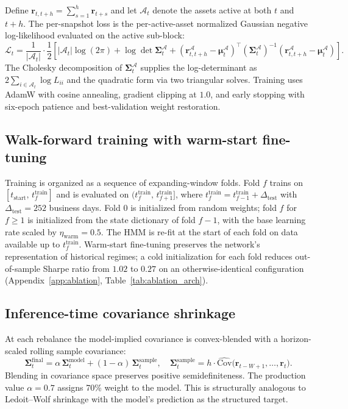 \documentclass[11pt]{article}
\newcommand{\Cov}{\mathrm{Cov}}
\newcommand{\Sig}{\boldsymbol{\Sigma}}
\newcommand{\bmu}{\boldsymbol{\mu}}
\newcommand{\br}{\mathbf{r}}
\begin{document}
Define $\br_{t,t+h} = \sum_{s=1}^{h}\br_{t+s}$ and let $\mathcal{A}_t$
denote the assets active at both $t$ and $t{+}h$. The per-snapshot
loss is the per-active-asset normalized Gaussian negative
log-likelihood evaluated on the active sub-block:
\begin{equation}
\mathcal{L}_t = \frac{1}{|\mathcal{A}_t|}\cdot
\frac{1}{2}\!\left[
|\mathcal{A}_t|\log(2\pi)
+ \log\det \Sig_t^{\mathcal{A}}
+ (\br_{t,t+h}^{\mathcal{A}} - \bmu_t^{\mathcal{A}})^\top
  (\Sig_t^{\mathcal{A}})^{-1}
  (\br_{t,t+h}^{\mathcal{A}} - \bmu_t^{\mathcal{A}})
\right].
\label{eq:nll}
\end{equation}
The Cholesky decomposition of $\Sig_t^{\mathcal{A}}$ supplies the
log-determinant as $2\sum_{i\in\mathcal{A}_t}\log L_{ii}$ and the
quadratic form via two triangular solves. Training uses AdamW with
cosine annealing, gradient clipping at $1.0$, and early stopping with
six-epoch patience and best-validation weight restoration.

\subsection{Walk-forward training with warm-start fine-tuning}\label{sec:walkforward}

Training is organized as a sequence of expanding-window folds. Fold $f$
trains on $[t_{\text{start}},\, t_f^{\text{train}}]$ and is evaluated
on $(t_f^{\text{train}},\, t_{f+1}^{\text{train}}]$, where
$t_f^{\text{train}} = t_{f-1}^{\text{train}} + \Delta_{\text{test}}$
with $\Delta_{\text{test}} = 252$ business days. Fold $0$ is initialized
from random weights; fold $f$ for $f\geq 1$ is initialized from the
state dictionary of fold $f{-}1$, with the base learning rate scaled by
$\eta_{\text{warm}} = 0.5$. The HMM is re-fit at the start of each fold
on data available up to $t_f^{\text{train}}$. Warm-start fine-tuning
preserves the network's representation of historical regimes; a cold
initialization for each fold reduces out-of-sample Sharpe ratio from
$1.02$ to $0.27$ on an otherwise-identical configuration
(Appendix~\ref{app:ablation}, Table~\ref{tab:ablation_arch}).

\subsection{Inference-time covariance shrinkage}\label{sec:shrinkage}

At each rebalance the model-implied covariance is convex-blended with a
horizon-scaled rolling sample covariance:
\begin{equation}
\Sig_t^{\text{final}} = \alpha\,\Sig_t^{\text{model}} + (1-\alpha)\,\Sig_t^{\text{sample}},
\quad
\Sig_t^{\text{sample}} = h\cdot \widehat{\Cov}\bigl(\br_{t-W+1},\ldots,\br_t\bigr).
\label{eq:shrinkage}
\end{equation}
Blending in covariance space preserves positive semidefiniteness. The
production value $\alpha = 0.7$ assigns 70\% weight to the model.
This is structurally analogous to Ledoit--Wolf shrinkage
\citep{ledoit2004} with the model's prediction as the structured
target.
\end{document}
